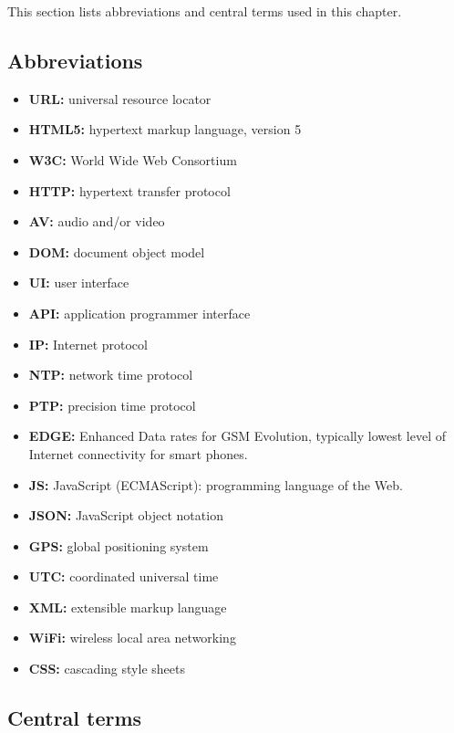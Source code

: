 This section lists abbreviations and central terms used in this chapter.

\subsection{Abbreviations}

\begin{itemize}
\item{\textbf{URL:} universal resource locator}
\item{\textbf{HTML5:} hypertext markup language, version 5}
\item{\textbf{W3C:} World Wide Web Consortium}
\item{\textbf{HTTP:} hypertext transfer protocol}
\item{\textbf{AV:} audio and/or video}
\item{\textbf{DOM:} document object model}
\item{\textbf{UI:} user interface}
\item{\textbf{API:} application programmer interface}
\item{\textbf{IP:} Internet protocol}
\item{\textbf{NTP:} network time protocol}
\item{\textbf{PTP:} precision time protocol}
\item{\textbf{EDGE:} Enhanced Data rates for GSM Evolution, typically lowest level of Internet connectivity for smart phones.}
\item{\textbf{JS:}} JavaScript (ECMAScript): programming language of the Web.
\item{\textbf{JSON:} JavaScript object notation}
\item{\textbf{GPS:} global positioning system}
\item{\textbf{UTC:} coordinated universal time}
\item{\textbf{XML:} extensible markup language}
\item{\textbf{WiFi:} wireless local area networking}
\item{\textbf{CSS:}} cascading style sheets
\end{itemize}


\subsection{Central terms}

